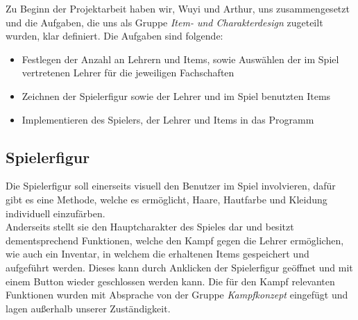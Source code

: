 Zu Beginn der Projektarbeit haben wir, Wuyi und Arthur, uns zusammengesetzt und die Aufgaben, die uns als Gruppe \emph{Item- und Charakterdesign} zugeteilt wurden, klar definiert. Die Aufgaben sind folgende:

\begin{itemize}
	\item Festlegen der Anzahl an Lehrern und Items, sowie Auswählen der im Spiel vertretenen Lehrer für die jeweiligen Fachschaften
	\item Zeichnen der Spielerfigur sowie der Lehrer und im Spiel benutzten Items
	\item Implementieren des Spielers, der Lehrer und Items in das Programm 
\end{itemize}

\subsection{Spielerfigur}
Die Spielerfigur soll einerseits visuell den Benutzer im Spiel involvieren, dafür gibt es eine Methode, welche es ermöglicht, Haare, Hautfarbe und Kleidung individuell einzufärben.\\ Anderseits stellt sie den Hauptcharakter des Spieles dar und besitzt dementsprechend Funktionen, welche den Kampf gegen die Lehrer ermöglichen, wie auch ein Inventar, in welchem die erhaltenen Items gespeichert und aufgeführt werden. Dieses kann durch Anklicken der Spielerfigur geöffnet und mit einem Button wieder geschlossen werden kann. Die für den Kampf relevanten Funktionen wurden mit Absprache von der Gruppe \emph{Kampfkonzept} eingefügt und lagen außerhalb unserer Zuständigkeit.\\